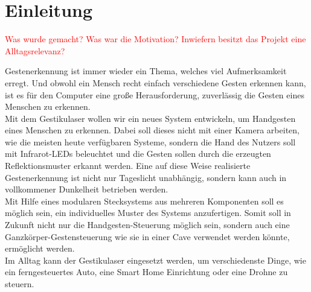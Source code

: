 \chapter{Einleitung}
\label{ch:Einleitung}

\textcolor{red}{Was wurde gemacht? Was war die Motivation? Inwiefern besitzt das Projekt eine Alltagsrelevanz?}

Gestenerkennung ist immer wieder ein Thema, welches viel Aufmerksamkeit erregt. Und obwohl ein Mensch recht einfach verschiedene Gesten erkennen kann, ist es für den Computer eine große Herausforderung, zuverlässig die Gesten eines Menschen zu erkennen. \\
Mit dem Gestikulaser wollen wir ein neues System entwickeln, um Handgesten eines Menschen zu erkennen. Dabei soll dieses nicht mit einer Kamera arbeiten, wie die meisten heute verfügbaren Systeme, sondern die Hand des Nutzers soll mit Infrarot-LEDs beleuchtet und die Gesten sollen durch die erzeugten Reflektionsmuster erkannt werden. Eine auf diese Weise realisierte Gestenerkennung ist nicht nur Tageslicht unabhängig, sondern kann auch in vollkommener Dunkelheit betrieben werden. \\
Mit Hilfe eines modularen Stecksystems aus mehreren Komponenten soll es möglich sein, ein individuelles Muster des Systems anzufertigen. Somit soll in Zukunft nicht nur die Handgesten-Steuerung möglich sein, sondern auch eine Ganzkörper-Gestensteuerung wie sie in einer Cave verwendet werden könnte, ermöglicht werden. \\

Im Alltag kann der Gestikulaser eingesetzt werden, um verschiedenste Dinge, wie ein ferngesteuertes Auto, eine Smart Home Einrichtung oder eine Drohne zu steuern. 